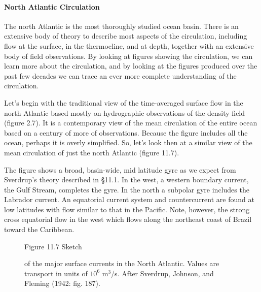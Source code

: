\paragraph{North Atlantic Circulation}
The north Atlantic is the most thoroughly studied ocean basin. There is an extensive body of theory to describe most aspects of the circulation, including flow at the surface, in the thermocline, and at depth, together with an extensive body of field observations. By looking at figures showing the circulation, we can learn more about the circulation, and by looking at the figures produced over the past few decades we can trace an ever more complete
understanding of the circulation.

Let's begin with the traditional view of the time-averaged surface flow in the north Atlantic based mostly on hydrographic observations of the density field (figure 2.7). It is a contemporary view of the mean circulation of the entire ocean based on a century of more of observations. Because the figure includes all the ocean, perhaps  it is overly simplified. So, let's look then at a similar view of the mean circulation of just the north Atlantic (figure 11.7).

The figure shows a broad, basin-wide, mid latitude gyre as we expect from Sverdrup's theory described in \S 11.1. In the west, a western boundary current, the Gulf Stream, completes the gyre. In the north a subpolar gyre includes the Labrador current. An equatorial current system and countercurrent are found at low latitudes with flow similar to that in the
Pacific. Note, however, the strong cross equatorial flow in the west which flows along the northeast coast of Brazil toward the Caribbean.

\begin{figure}[t!]
\centering
\footnotesize
Figure 11.7  Sketch \rule{0mm}{3ex}of the major surface currents in the North Atlantic. Values are transport in units of $10^6$ m$^3$/s. After Sverdrup, Johnson, and Fleming (1942: fig. 187).

\label{fig:NAtlcur1}
\vspace{-4ex}
\end{figure}

